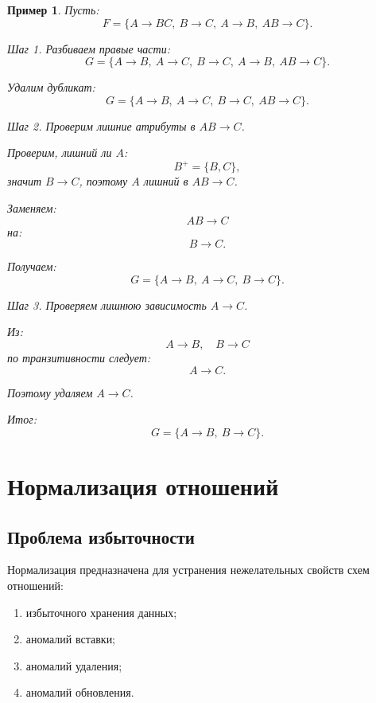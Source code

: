 \documentclass[12pt,a4paper]{article}
\newtheorem{example}{Пример}[section]
\theoremstyle{remark}
\begin{document}
\begin{example}
Пусть:
\[
F = \{A \to BC,\ B \to C,\ A \to B,\ AB \to C\}.
\]

Шаг 1. Разбиваем правые части:
\[
G = \{A \to B,\ A \to C,\ B \to C,\ A \to B,\ AB \to C\}.
\]

Удалим дубликат:
\[
G = \{A \to B,\ A \to C,\ B \to C,\ AB \to C\}.
\]

Шаг 2. Проверим лишние атрибуты в $AB \to C$.

Проверим, лишний ли $A$:
\[
B^+ = \{B,C\},
\]
значит $B \to C$, поэтому $A$ лишний в $AB \to C$.

Заменяем:
\[
AB \to C
\]
на:
\[
B \to C.
\]

Получаем:
\[
G = \{A \to B,\ A \to C,\ B \to C\}.
\]

Шаг 3. Проверяем лишнюю зависимость $A \to C$.

Из:
\[
A \to B,\quad B \to C
\]
по транзитивности следует:
\[
A \to C.
\]

Поэтому удаляем $A \to C$.

Итог:
\[
G = \{A \to B,\ B \to C\}.
\]
\end{example}

\section{Нормализация отношений}

\subsection{Проблема избыточности}

Нормализация предназначена для устранения нежелательных свойств схем отношений:
\begin{enumerate}
    \item избыточного хранения данных;
    \item аномалий вставки;
    \item аномалий удаления;
    \item аномалий обновления.
\end{enumerate}
\end{document}
